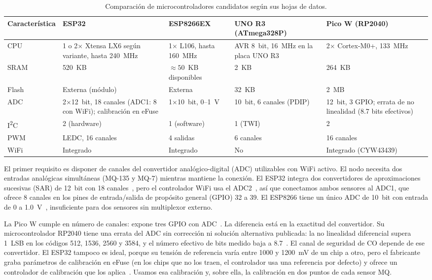 \documentclass[manuscript,screen,nonacm,natbib=false]{acmart}
\newcommand{\IIC}{I\textsuperscript{2}C}
\begin{document}
\begin{table}[htbp]
\caption{Comparación de microcontroladores candidatos según sus hojas de datos.}
\label{tab:mcu}
\footnotesize
\begin{tabularx}{\linewidth}{@{}P{2.3cm} Y Y Y Y@{}}
\toprule
Característica & ESP32~\cite{espressif2026esp32} & ESP8266EX~\cite{espressif2025esp8266} & UNO R3 (ATmega328P)~\cite{microchip2018atmega328p} & Pico W (RP2040)~\cite{raspberrypi2026picow} \\
\midrule
CPU & 1 o 2$\times$ Xtensa LX6 según variante, hasta 240~MHz & 1$\times$ L106, hasta 160~MHz & AVR 8~bit, 16~MHz en la placa UNO R3 & 2$\times$ Cortex-M0+, 133~MHz \\
SRAM & 520~KB & $\approx 50$~KB disponibles & 2~KB & 264~KB \\
Flash & Externa (módulo) & Externa & 32~KB & 2~MB \\
ADC & 2$\times$12~bit, 18 canales (ADC1: 8 con WiFi); calibración en eFuse & 1$\times$10~bit, 0--1~V & 10~bit, 6 canales (PDIP) & 12~bit, 3 GPIO; errata de no linealidad (8.7 bits efectivos)~\cite{raspberrypi2025rp2040} \\
\IIC{} & 2 (hardware) & 1 (software) & 1 (TWI) & 2 \\
PWM & LEDC, 16 canales & 4 salidas & 6 canales & 16 canales \\
WiFi & Integrado & Integrado & No & Integrado (CYW43439) \\
\bottomrule
\end{tabularx}
\end{table}

El primer requisito es disponer de canales del convertidor analógico-digital (ADC) utilizables con WiFi activo. El nodo necesita dos entradas analógicas simultáneas (MQ-135 y MQ-7) mientras mantiene la conexión. El ESP32 integra dos convertidores de aproximaciones sucesivas (SAR) de 12~bit con 18 canales~\cite{espressif2026esp32}, pero el controlador WiFi usa el ADC2~\cite{espressif2026adc}, así que conectamos ambos sensores al ADC1, que ofrece 8 canales en los pines de entrada/salida de propósito general (GPIO) 32 a 39. El ESP8266 tiene un único ADC de 10~bit con entrada de 0 a 1.0~V~\cite{espressif2025esp8266}, insuficiente para dos sensores sin multiplexor externo.

La Pico W cumple en número de canales: expone tres GPIO con ADC~\cite{raspberrypi2026picow}. La diferencia está en la exactitud del convertidor. Su microcontrolador RP2040 tiene una errata del ADC sin corrección ni solución alternativa publicada: la no linealidad diferencial supera 1~LSB en los códigos 512, 1536, 2560 y 3584, y el número efectivo de bits medido baja a 8.7~\cite{raspberrypi2025rp2040}. El canal de seguridad de CO depende de ese convertidor. El ESP32 tampoco es ideal, porque su tensión de referencia varía entre 1000 y 1200~mV de un chip a otro, pero el fabricante graba parámetros de calibración en eFuse (en los chips que no los traen, el controlador usa una referencia por defecto) y ofrece un controlador de calibración que los aplica~\cite{espressif2026adccal}. Usamos esa calibración y, sobre ella, la calibración en dos puntos de cada sensor MQ.
\end{document}
